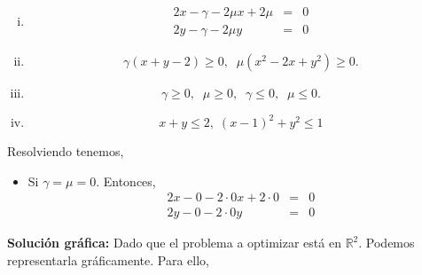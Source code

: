 \begin{enumerate}
	\begin{enumerate}[i)]
	    \item
		$$\begin{array}{rcl}
		    2x-\gamma - 2\mu x+2\mu&=&0\\
		    2y-\gamma -2\mu y&=&0
		\end{array}$$

	    \item $$\gamma(x+y-2)\geq 0,\; \; \mu(x^2-2x+y^2)\geq 0.$$ 
	    \item $$\gamma\geq 0,\; \; \mu\geq 0, \; \; \gamma\leq 0,\; \; \mu\leq 0.$$
	    \item $$x+y\leq 2,\; (x-1)^2+y^2\leq 1$$
	\end{enumerate}

	Resolviendo tenemos,

	\begin{itemize}
	    \item Si $\gamma =\mu =0$. Entonces,
		$$\begin{array}{rcl}
		    2x-0 - 2\cdot 0 x+2\cdot 0&=&0\\
		    2y-0 -2\cdot 0 y&=&0
		\end{array}$$
	\end{itemize}

	\textbf{Solución gráfica:}
	Dado que el problema a optimizar está en $\mathbb{R}^2$. Podemos representarla gráficamente. Para ello,
	


\end{enumerate}




